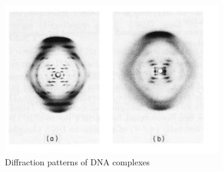 \begin{figure}[H]
    \includegraphics[width=1\columnwidth]{figures/DNA diffraction.PNG}
    \caption{Diffraction patterns of DNA complexes}
    \label{fig:DNA diffraction}
\end{figure}